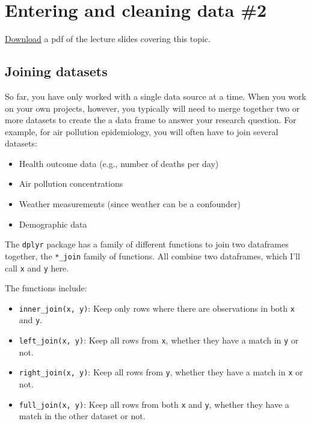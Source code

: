 \documentclass[]{book}
\providecommand{\tightlist}{%
  \setlength{\itemsep}{0pt}\setlength{\parskip}{0pt}}
\begin{document}
\chapter{Entering and cleaning data
\#2}\label{entering-and-cleaning-data-2}

\href{https://github.com/geanders/RProgrammingForResearch/raw/master/slides/CourseNotes_Week6.pdf}{Download}
a pdf of the lecture slides covering this topic.

\section{Joining datasets}\label{joining-datasets}

So far, you have only worked with a single data source at a time. When
you work on your own projects, however, you typically will need to merge
together two or more datasets to create the a data frame to answer your
research question. For example, for air pollution epidemiology, you will
often have to join several datasets:

\begin{itemize}
\tightlist
\item
  Health outcome data (e.g., number of deaths per day)
\item
  Air pollution concentrations
\item
  Weather measurements (since weather can be a confounder)
\item
  Demographic data
\end{itemize}

The \texttt{dplyr} package has a family of different functions to join
two dataframes together, the \texttt{*\_join} family of functions. All
combine two dataframes, which I'll call \texttt{x} and \texttt{y} here.
\medskip

The functions include:

\begin{itemize}
\tightlist
\item
  \texttt{inner\_join(x,\ y)}: Keep only rows where there are
  observations in both \texttt{x} and \texttt{y}.
\item
  \texttt{left\_join(x,\ y)}: Keep all rows from \texttt{x}, whether
  they have a match in \texttt{y} or not.
\item
  \texttt{right\_join(x,\ y)}: Keep all rows from \texttt{y}, whether
  they have a match in \texttt{x} or not.
\item
  \texttt{full\_join(x,\ y)}: Keep all rows from both \texttt{x} and
  \texttt{y}, whether they have a match in the other dataset or not.
\end{itemize}
\end{document}
